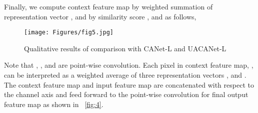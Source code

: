\documentclass[sigconf]{acmart}
\begin{document}
Finally, we compute context feature map by weighted summation of representation vector ,  and  by similarity score ,  and  as follows,

\begin{figure*}[]
  \centering
  \texttt{[image: Figures/fig5.jpg]}
  \caption{Qualitative results of comparison with CANet-L and UACANet-L}
    \label{fig:5}
\end{figure*}



Note that , ,  and  are point-wise convolution. Each pixel in context feature map, , can be interpreted as a weighted average of three representation vectors ,  and . The context feature map  and input feature map  are concatenated with respect to the channel axis and feed forward to the point-wise convolution for final output feature map as shown in \figureautorefname~\ref{fig:4}.
\end{document}

